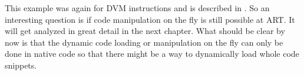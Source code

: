 This example was again for DVM instructions and is described in \parencite{code_protection}. So an interesting question is if code manipulation on the fly
is still possible at ART. It will get analyzed in great detail in the next chapter. What should be clear by now is that the dynamic code loading or manipulation on the
fly can only be done in native code so that there might be a way to dynamically
load whole code snippets.
